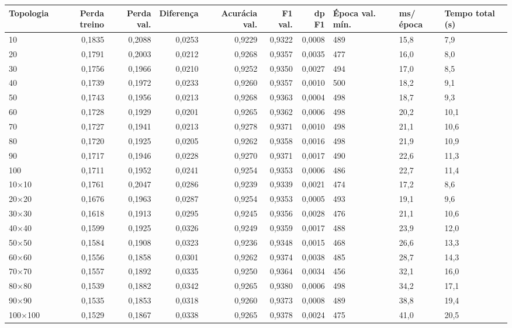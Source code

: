 \begin{tabular}{lrrrrrrlll}
\toprule
Topologia & Perda treino & Perda val. & Diferença & Acurácia val. & F1 val. & dp F1 & Época val. mín. & ms/época & Tempo total (s) \\
\midrule
10 & 0,1835 & 0,2088 & 0,0253 & 0,9229 & 0,9322 & 0,0008 & 489 & 15,8 & 7,9 \\
20 & 0,1791 & 0,2003 & 0,0212 & 0,9268 & 0,9357 & 0,0035 & 477 & 16,0 & 8,0 \\
30 & 0,1756 & 0,1966 & 0,0210 & 0,9252 & 0,9350 & 0,0027 & 494 & 17,0 & 8,5 \\
40 & 0,1739 & 0,1972 & 0,0233 & 0,9260 & 0,9357 & 0,0010 & 500 & 18,2 & 9,1 \\
50 & 0,1743 & 0,1956 & 0,0213 & 0,9268 & 0,9363 & 0,0004 & 498 & 18,7 & 9,3 \\
60 & 0,1728 & 0,1929 & 0,0201 & 0,9265 & 0,9362 & 0,0006 & 498 & 20,2 & 10,1 \\
70 & 0,1727 & 0,1941 & 0,0213 & 0,9278 & 0,9371 & 0,0010 & 498 & 21,1 & 10,6 \\
80 & 0,1720 & 0,1925 & 0,0205 & 0,9262 & 0,9358 & 0,0016 & 498 & 21,9 & 10,9 \\
90 & 0,1717 & 0,1946 & 0,0228 & 0,9270 & 0,9371 & 0,0017 & 490 & 22,6 & 11,3 \\
100 & 0,1711 & 0,1952 & 0,0241 & 0,9254 & 0,9353 & 0,0006 & 486 & 22,7 & 11,4 \\
10×10 & 0,1761 & 0,2047 & 0,0286 & 0,9239 & 0,9339 & 0,0021 & 474 & 17,2 & 8,6 \\
20×20 & 0,1676 & 0,1963 & 0,0287 & 0,9254 & 0,9353 & 0,0005 & 493 & 19,1 & 9,6 \\
30×30 & 0,1618 & 0,1913 & 0,0295 & 0,9245 & 0,9356 & 0,0028 & 476 & 21,1 & 10,6 \\
40×40 & 0,1599 & 0,1925 & 0,0326 & 0,9249 & 0,9359 & 0,0017 & 488 & 23,9 & 12,0 \\
50×50 & 0,1584 & 0,1908 & 0,0323 & 0,9236 & 0,9348 & 0,0015 & 468 & 26,6 & 13,3 \\
60×60 & 0,1556 & 0,1858 & 0,0301 & 0,9262 & 0,9374 & 0,0038 & 485 & 28,7 & 14,3 \\
70×70 & 0,1557 & 0,1892 & 0,0335 & 0,9250 & 0,9364 & 0,0034 & 456 & 32,1 & 16,0 \\
80×80 & 0,1539 & 0,1882 & 0,0342 & 0,9265 & 0,9380 & 0,0006 & 498 & 34,2 & 17,1 \\
90×90 & 0,1535 & 0,1853 & 0,0318 & 0,9260 & 0,9373 & 0,0008 & 489 & 38,8 & 19,4 \\
100×100 & 0,1529 & 0,1867 & 0,0338 & 0,9265 & 0,9378 & 0,0024 & 475 & 41,0 & 20,5 \\

\end{tabular}
